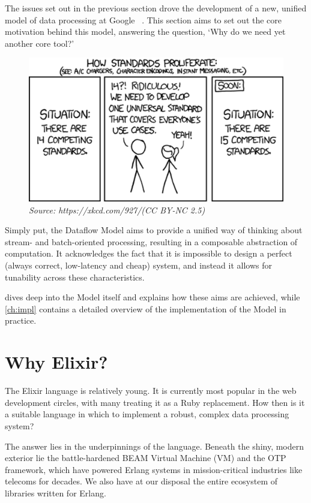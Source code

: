 The issues set out in the previous section drove the development of a new, unified model of data processing at Google ~\cite{Akidau:2015}.
This section aims to set out the core motivation behind this model, answering the question, `Why do we need yet another core tool?'

\begin{figure}[h]
	\centering
	\includegraphics[width=.75\textwidth]{images/xkcd-standards}
	\caption*{\textit{Source: https://xkcd.com/927/\quad(CC BY-NC 2.5)}}
\end{figure}

Simply put, the Dataflow Model aims to provide a unified way of thinking about stream- and batch-oriented processing, resulting in a composable abstraction of computation.
It acknowledges the fact that it is impossible to design a perfect (always correct, low-latency and cheap) system, and instead it allows for tunability across these characteristics.

 dives deep into the Model itself and explains how these aims are achieved, while \cref{ch:impl} contains a detailed overview of the implementation of the Model in practice.

\section{Why Elixir?}\label{sec:intro:elixir}

The Elixir language \cite{Elixir} is relatively young.
It is currently most popular in the web development circles, with many treating it as a Ruby replacement.
How then is it a suitable language in which to implement a robust, complex data processing system?

The answer lies in the underpinnings of the language.
Beneath the shiny, modern exterior lie the battle-hardened BEAM Virtual Machine (VM) and the OTP framework, which have powered Erlang systems in mission-critical industries like telecoms for decades.
We also have at our disposal the entire ecosystem of libraries written for Erlang.

